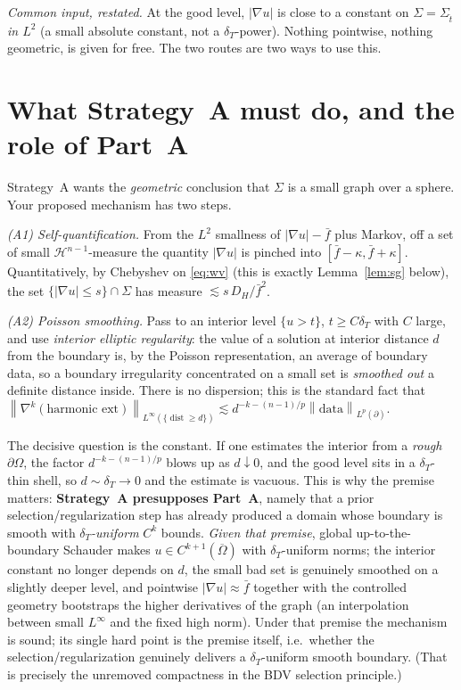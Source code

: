 \documentclass[11pt]{amsart}
\theoremstyle{definition}
\theoremstyle{remark}
\newcommand{\Om}{\Omega}
\newcommand{\dT}{\delta_T}
\newcommand{\Sg}{\Sigma}
\newcommand{\fbar}{\bar f}
\newcommand{\Hn}{\mathcal H^{n-1}}
\newcommand{\norm}[1]{\left\lVert#1\right\rVert}
\DeclareMathOperator{\dist}{dist}
\begin{document}
\emph{Common input, restated.} At the good level, $|\nabla u|$ is close
to a constant on $\Sg=\Sg_{\hat t}$ \emph{in $L^2$} (a small absolute
constant, not a $\dT$-power). Nothing pointwise, nothing geometric, is
given for free. The two routes are two ways to use this.

\section{What Strategy~A must do, and the role of Part~A}

Strategy~A wants the \emph{geometric} conclusion that $\Sg$ is a small
graph over a sphere. Your proposed mechanism has two steps.

\emph{(A1) Self-quantification.} From the $L^2$ smallness of
$|\nabla u|-\fbar$ plus Markov, off a set of small $\Hn$-measure the
quantity $|\nabla u|$ is pinched into $[\fbar-\kappa,\fbar+\kappa]$.
Quantitatively, by Chebyshev on \eqref{eq:wv} (this is exactly
Lemma~\ref{lem:sg} below), the set $\{|\nabla u|\le s\}\cap\Sg$ has
measure $\lesssim s\,D_H/\fbar^2$.

\emph{(A2) Poisson smoothing.} Pass to an interior level
$\{u>t\}$, $t\ge C\dT$ with $C$ large, and use \emph{interior elliptic
regularity}: the value of a solution at interior distance $d$ from the
boundary is, by the Poisson representation, an average of boundary
data, so a boundary irregularity concentrated on a small set is
\emph{smoothed out} a definite distance inside. There is no dispersion;
this is the standard fact that
$\norm{\nabla^k(\text{harmonic ext})}_{L^\infty(\{\dist\ge d\})}
\lesssim d^{-k-(n-1)/p}\norm{\text{data}}_{L^p(\partial)}$.

The decisive question is the constant. If one estimates the interior
from a \emph{rough} $\partial\Om$, the factor $d^{-k-(n-1)/p}$ blows up
as $d\downarrow0$, and the good level sits in a $\dT$-thin shell, so
$d\sim\dT\to0$ and the estimate is vacuous. This is why the premise
matters: \textbf{Strategy~A presupposes Part~A}, namely that a prior
selection/regularization step has already produced a domain whose
boundary is smooth with \emph{$\dT$-uniform} $C^k$ bounds. \emph{Given
that premise}, global up-to-the-boundary Schauder makes
$u\in C^{k+1}(\overline\Om)$ with $\dT$-uniform norms; the interior
constant no longer depends on $d$, the small bad set is genuinely
smoothed on a slightly deeper level, and pointwise $|\nabla u|\approx
\fbar$ together with the controlled geometry bootstraps the higher
derivatives of the graph (an interpolation between small $L^\infty$ and
the fixed high norm). Under that premise the mechanism is sound; its
single hard point is the premise itself, i.e.\ whether the
selection/regularization genuinely delivers a $\dT$-uniform smooth
boundary. (That is precisely the unremoved compactness in the BDV
selection principle.)
\end{document}
